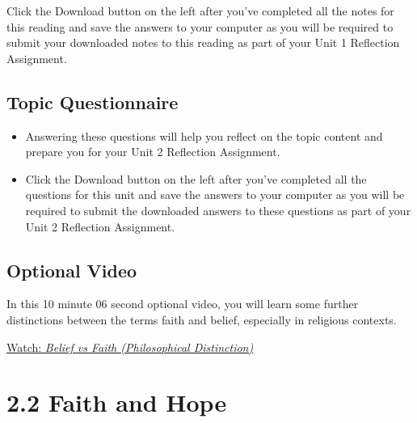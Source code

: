 \documentclass[
]{book}
\providecommand{\tightlist}{%
  \setlength{\itemsep}{0pt}\setlength{\parskip}{0pt}}
\begin{document}
\begin{reflect}
Click the Download button on the left after you've completed all the notes for this reading and save the answers to your computer as you will be required to submit your downloaded notes to this reading as part of your Unit 1 Reflection Assignment.
\end{reflect}

\hypertarget{topic-questionnaire-4}{%
\subsection*{Topic Questionnaire}\label{topic-questionnaire-4}}

\begin{reflect}
\begin{itemize}
\tightlist
\item
  Answering these questions will help you reflect on the topic content and prepare you for your Unit 2 Reflection Assignment.
\item
  Click the Download button on the left after you've completed all the questions for this unit and save the answers to your computer as you will be required to submit the downloaded answers to these questions as part of your Unit 2 Reflection Assignment.
\end{itemize}
\end{reflect}

\hypertarget{optional-video-4}{%
\subsection*{Optional Video}\label{optional-video-4}}

\begin{reflect}
In this 10 minute 06 second optional video, you will learn some further distinctions between the terms faith and belief, especially in religious contexts.

\href{https://www.youtube.com/watch?v=o8QKkHWUSu0}{Watch: \emph{Belief vs Faith (Philosophical Distinction)}}
\end{reflect}

\hypertarget{faith-and-hope}{%
\section*{2.2 Faith and Hope}\label{faith-and-hope}}
\end{document}
